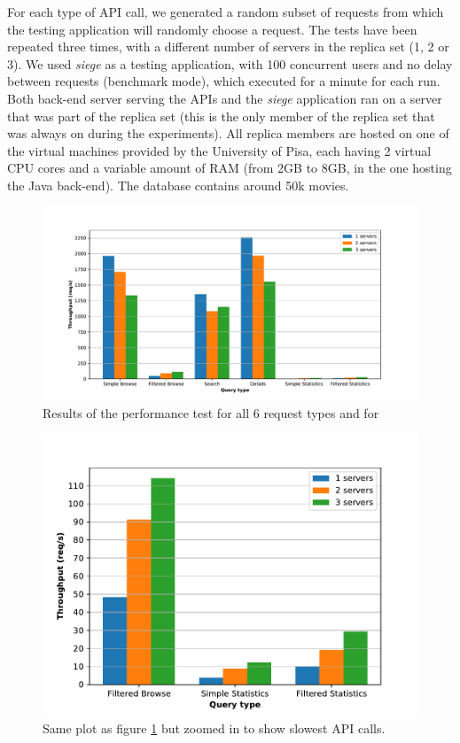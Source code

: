 \documentclass[11pt]{article}
\begin{document}
For each type of API call, we generated a random subset of requests from which the testing application will randomly choose a request. 
The tests have been repeated three times, with a different number of servers in the replica set (1, 2 or 3).
We used \emph{siege} as a testing application, with 100 concurrent users and no delay between requests (benchmark mode), which executed for a minute for each run. Both back-end server serving the APIs and the \emph{siege} application ran on a server that was part of the replica set (this is the only member of the replica set that was always on during the experiments). All replica members are hosted on one of the virtual machines provided by the University of Pisa, each having 2 virtual CPU cores and a variable amount of RAM (from 2GB to 8GB, in the one hosting the Java back-end). The database contains around 50k movies. 

\begin{figure}[]
	\centering
	\includegraphics[width=\textwidth]{figs/siege_barplot_all.pdf}
	\caption{Results of the performance test for all 6 request types and for }
	\label{fig:barplot_all}
\end{figure}
\begin{figure}[]
	\centering
	\includegraphics[width=\textwidth]{figs/siege_barplot_slow.pdf}
	\caption{Same plot as figure \ref{fig:barplot_all} but zoomed in to show slowest API calls.}
	\label{fig:barplot_slow}
\end{figure}
\end{document}

